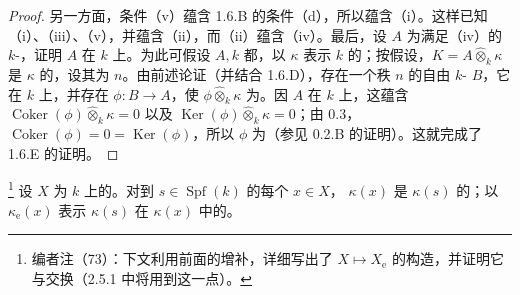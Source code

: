 \begin{proof}
另一方面，条件（v）蕴含 1.6.B 的条件（d），所以蕴含（i）。这样已知（i）、（iii）、（v），并蕴含（ii），而（ii）蕴含（iv）。最后，设 $A$ 为满足（iv）的 $k$-，证明 $A$ 在 $k$ 上。为此可假设 $A,k$ 都，以 $\kappa$ 表示 $k$ 的；按假设，$K=A\widehat\otimes_k\kappa$ 是 $\kappa$ 的，设其为 $n$。由前述论证（并结合 1.6.D），存在一个秩 $n$ 的自由 $k$- $B$，它在 $k$ 上，并存在 $\phi:B\to A$，使 $\phi\widehat\otimes_k\kappa$ 为。因 $A$ 在 $k$ 上，这蕴含 $\operatorname{Coker}(\phi)\widehat\otimes_k\kappa=0$ 以及 $\operatorname{Ker}(\phi)\widehat\otimes_k\kappa=0$；由  0.3，$\operatorname{Coker}(\phi)=0=\operatorname{Ker}(\phi)$，所以 $\phi$ 为（参见 0.2.B 的证明）。这就完成了 1.6.E 的证明。
\end{proof}
\footnote{编者注（73）：下文利用前面的增补，详细写出了 $X\mapsto X_{\mathrm e}$ 的构造，并证明它与交换（2.5.1 中将用到这一点）。} 设 $X$ 为 $k$ 上的。对到 $s\in\operatorname{Spf}(k)$ 的每个 $x\in X$， $\kappa(x)$ 是 $\kappa(s)$ 的；以 $\kappa_{\mathrm e}(x)$ 表示 $\kappa(s)$ 在 $\kappa(x)$ 中的。
